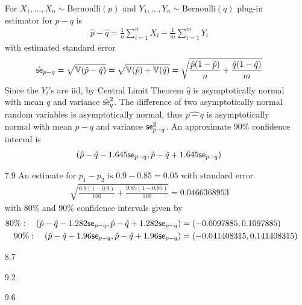 \documentclass[a4paper,10pt]{article}
\theoremstyle{definition}
\begin{document}
\begin{enumerate}
For $X_1, \ldots, X_n \sim \text{Bernoulli}(p)$ and $Y_1, \ldots, Y_n \sim \text{Bernoulli}(q)$ plug-in estimator for $p-q$ is 
\begin{align*}
\hat{p}-\hat{q}=\frac{1}{n}\sum_{i=1}^{n}X_i - \frac{1}{m}\sum_{i=1}^{m}Y_i
\end{align*}
with estimated standard error 
\begin{align*}
\hat{\text{\sffamily se}}_{p-q} = \sqrt{\mathbb{V}(\hat{p}-\hat{q})} = \sqrt{\mathbb{V}(\hat{p})+\mathbb{V}(\hat{q})}= \sqrt{\frac{\hat{p}(1-\hat{p})}{n}+\frac{\hat{q}(1-\hat{q})}{m} }
\end{align*}
Since the $Y_i$'s are iid, by Central Limit Theorem $\hat{q}$ is asymptotically normal with mean $q$ and variance $\hat{\text{\sffamily se}}_q^2$. The difference of two asymptotically normal random variables is asymptotically normal, thus $\hat{p-q}$ is asymptotically normal with mean $p-q$ and variance $\text{\sffamily se}_{p-q}^2$. An approximate $90\%$ confidence interval is 
\begin{align*}
(\hat{p}-\hat{q}-1.645\text{\sffamily se}_{p-q},\hat{p}-\hat{q}+1.645\text{\sffamily se}_{p-q})
\end{align*}
\item[7.9] An estimate for $p_1-p_2$ is $0.9-0.85=0.05$ with standard error 
\begin{align*}
\sqrt{\frac{0.9(1-0.9)}{100}+\frac{0.85(1-0.85)}{100}}= 0.0466368953
\end{align*}
with $80\%$ and $90\%$ confidence intervals given by
\begin{align*}
80\%:\quad(\hat{p}-\hat{q}-1.282\text{\sffamily se}_{p-q},\hat{p}-\hat{q}+1.282\text{\sffamily se}_{p-q})&=(-0.0097885,0.1097885)\\
90\%:\quad(\hat{p}-\hat{q}-1.96\text{\sffamily se}_{p-q},\hat{p}-\hat{q}+1.96\text{\sffamily se}_{p-q})&=(-0.041408315,0.141408315)
\end{align*} 

\item[8.7]

\item[9.2]

\item[9.6] 

\end{enumerate}
\end{document}

